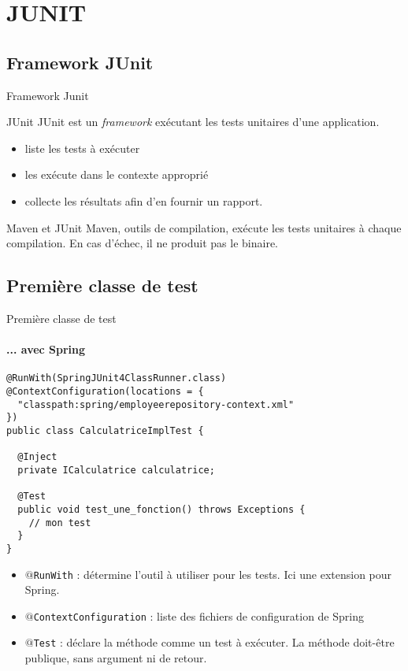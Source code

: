 \documentclass[compress]{beamer}%
\begin{document}
\section{JUNIT}

\subsection{Framework JUnit}

\begin{frame}{Framework Junit}

	\begin{block}{JUnit}
		JUnit est un \emph{framework} exécutant les tests unitaires d'une application.\\
		\pause
		\begin{itemize}
		\item liste les tests à exécuter
		\item les exécute dans le contexte approprié
		\item collecte les résultats afin d'en fournir un rapport.
		\end{itemize}
	\end{block}
		
	\pause
	\begin{block}{Maven et JUnit}
		Maven, outils de compilation, exécute les tests unitaires à chaque compilation. En cas d'échec, il ne produit pas le binaire.
	\end{block}

\end{frame}


\subsection{Première classe de test}

\begin{frame}[fragile]{Première classe de test}
	\framesubtitle{... avec Spring}
	
	\begin{lstlisting}	
@RunWith(SpringJUnit4ClassRunner.class)
@ContextConfiguration(locations = {
  "classpath:spring/employeerepository-context.xml"
})
public class CalculatriceImplTest {

  @Inject
  private ICalculatrice calculatrice;

  @Test
  public void test_une_fonction() throws Exceptions {
	// mon test
  }
}
	\end{lstlisting}
	
	\pause
	\begin{itemize}[<+->]
	\item \texttt{$@$RunWith} : détermine l'outil à utiliser pour les tests. Ici une extension pour Spring.
	\item \texttt{$@$ContextConfiguration} : liste des fichiers de configuration de Spring
	\item \texttt{$@$Test} : déclare la méthode comme un test à exécuter. La méthode doit-être publique, sans argument ni de retour.
	\end{itemize}

\end{frame}
\end{document}
